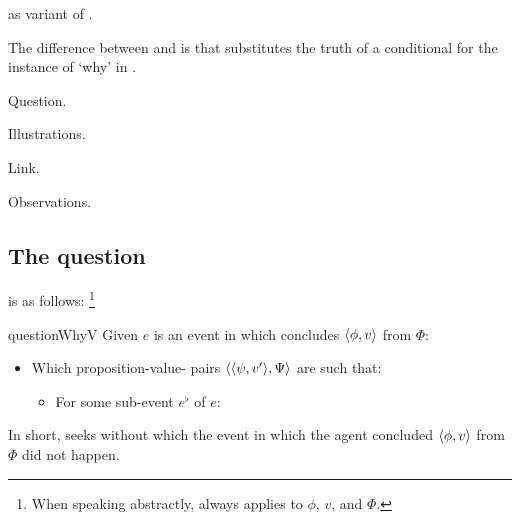 \begin{note}
  \qWhyV{} as variant of \qWhy{}.

  The difference between \qWhyV{} and \qWhy{} is that \qWhyV{} substitutes the truth of a conditional for  the instance of `why' in \qWhy{}.

  Question.

  Illustrations.

  Link.

  Observations.
\end{note}

\subsection{The question}
\label{cha:var:qwhyvnp:question}

\begin{note}
  \qWhyV{} is as follows:%
  \footnote{
    When speaking abstractly, \qWhyV{} always applies to \(\phi\), \(v\), and \(\Phi\).
  }

  \begin{question}{questionWhyV}{\qWhyV{}}%
    Given \(e\) is an event in which \vAgent{} concludes \(\langle \phi, v \rangle\) from \(\Phi\):

    \begin{itemize}
    \item
      Which proposition-value-\pool{} pairs \(\langle \langle \psi, v' \rangle, \Psi \rangle\) are such that:
      \begin{itemize}
      \item
        For some sub-event \(e^{\flat}\) of \(e\):
      \end{itemize}
    \end{itemize}
    \vspace{-1.5\baselineskip}
  \end{question}

  \noindent%
  In short, \qWhyV{} seeks \ros{} without which the event in which the agent concluded \(\langle \phi, v \rangle\) from \(\Phi\) did not happen.


\end{note}
